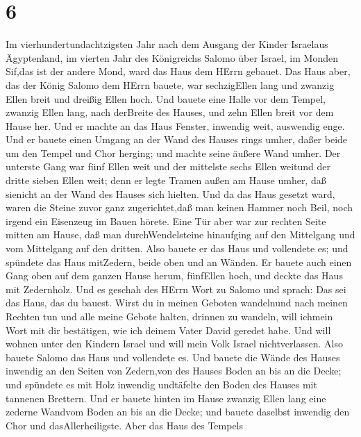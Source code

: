 \hypertarget{section-5}{%
\section{6}\label{section-5}}

 Im vierhundertundachtzigsten Jahr nach dem Ausgang der
Kinder Israelaus Ägyptenland, im vierten Jahr des Königreichs Salomo
über Israel, im Monden Sif,das ist der andere Mond, ward das Haus dem
HErrn gebauet.  Das Haus aber, das der König Salomo dem
HErrn bauete, war sechzigEllen lang und zwanzig Ellen breit und dreißig
Ellen hoch.  Und bauete eine Halle vor dem Tempel, zwanzig
Ellen lang, nach derBreite des Hauses, und zehn Ellen breit vor dem
Hause her.  Und er machte an das Haus Fenster, inwendig
weit, auswendig enge.  Und er bauete einen Umgang an der
Wand des Hauses rings umher, daßer beide um den Tempel und Chor herging;
und machte seine äußere Wand umher.  Der unterste Gang war
fünf Ellen weit und der mittelste sechs Ellen weitund der dritte sieben
Ellen weit; denn er legte Tramen außen am Hause umher, daß sienicht an
der Wand des Hauses sich hielten.  Und da das Haus gesetzt
ward, waren die Steine zuvor ganz zugerichtet,daß man keinen Hammer noch
Beil, noch irgend ein Eisenzeug im Bauen hörete.  Eine Tür
aber war zur rechten Seite mitten am Hause, daß man durchWendelsteine
hinaufging auf den Mittelgang und vom Mittelgang auf den dritten.
 Also bauete er das Haus und vollendete es; und spündete das
Haus mitZedern, beide oben und an Wänden.  Er bauete auch
einen Gang oben auf dem ganzen Hause herum, fünfEllen hoch, und deckte
das Haus mit Zedernholz.  Und es geschah des HErrn Wort zu
Salomo und sprach:  Das sei das Haus, das du bauest. Wirst
du in meinen Geboten wandelnund nach meinen Rechten tun und alle meine
Gebote halten, drinnen zu wandeln, will ichmein Wort mit dir bestätigen,
wie ich deinem Vater David geredet habe.  Und will wohnen
unter den Kindern Israel und will mein Volk Israel nichtverlassen.
 Also bauete Salomo das Haus und vollendete es.
 Und bauete die Wände des Hauses inwendig an den Seiten von
Zedern,von des Hauses Boden an bis an die Decke; und spündete es mit
Holz inwendig undtäfelte den Boden des Hauses mit tannenen Brettern.
 Und er bauete hinten im Hause zwanzig Ellen lang eine
zederne Wandvom Boden an bis an die Decke; und bauete daselbst inwendig
den Chor und dasAllerheiligste.  Aber das Haus des Tempels
